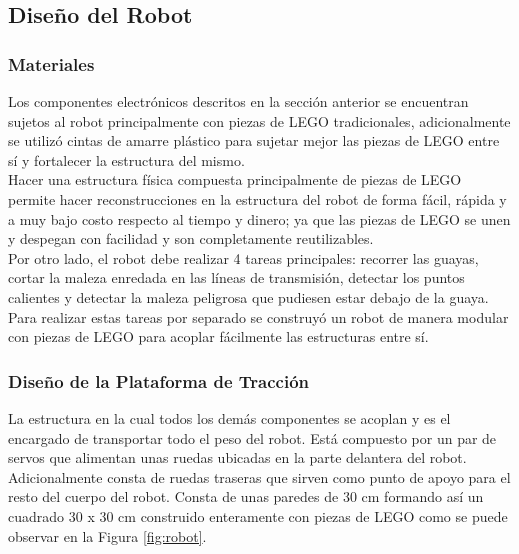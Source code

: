 \documentclass[conference]{IEEEtran}
\begin{document}
\bigskip

\subsection{Diseño del Robot}

\bigskip
\subsubsection{Materiales}

\bigskip

Los componentes electrónicos descritos en la sección anterior se encuentran sujetos al robot principalmente con piezas de LEGO\textregistered \vspace{2mm}  tradicionales, adicionalmente se utilizó cintas de amarre plástico para sujetar mejor las piezas de LEGO\textregistered \vspace{2mm}  entre sí y fortalecer la estructura del mismo. \\

Hacer una estructura física compuesta principalmente de piezas de LEGO\textregistered \vspace{2mm} permite hacer reconstrucciones en la estructura del robot de forma fácil, rápida y a muy bajo costo respecto al tiempo y dinero; ya que las piezas de LEGO\textregistered \vspace{2mm} se unen y despegan con facilidad y son completamente reutilizables.\\


Por otro lado, el robot debe realizar 4 tareas principales: recorrer las guayas, cortar la maleza enredada en las líneas de transmisión, detectar los puntos calientes y detectar la maleza peligrosa que pudiesen estar debajo de la guaya. \\

Para realizar estas tareas por separado se construyó un robot de manera modular con piezas de LEGO\textregistered \vspace{2mm} para acoplar fácilmente las estructuras entre sí. \\

\bigskip
\subsubsection{Diseño de la Plataforma de Tracción}

\bigskip

La estructura en la cual todos los demás componentes se acoplan y es el encargado de transportar todo el peso del robot. Está compuesto por un par de servos que alimentan unas ruedas ubicadas en la parte delantera del robot. Adicionalmente consta de ruedas traseras que sirven como punto de apoyo para el resto del cuerpo del robot. Consta de unas paredes de 30 cm formando así un cuadrado 30 x 30 cm construido enteramente con piezas de LEGO\textregistered \vspace{2mm} como se puede observar en la Figura \ref{fig:robot}.\\
\end{document}
